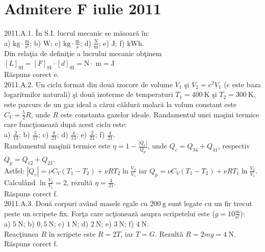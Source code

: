 \section{Admitere F iulie 2011}

2011.A.1. În S.I. lucrul mecanic se măsoară în:\\ a) $\mathrm{kg} \cdot \frac{\mathrm{m}}{\mathrm{s}^{2}}$; b) $\mathrm{W}$; c) $\mathrm{kg} \cdot \frac{\mathrm{m}}{\mathrm{s}}$; d) $\frac{\mathrm{N}}{\mathrm{m}}$; e) $\mathrm{J}$; f) $\mathrm{kWh}$.\\ Din relaţia de definiţie a lucrului mecanic obţinem $[L]_{\mathrm{SI}}=[F]_{\mathrm{SI}} \cdot[d]_{\mathrm{SI}}=\mathrm{N} \cdot \mathrm{~m}=\mathrm{J}$\\ Răspuns corect e.\\

2011.A.2. Un ciclu format din două izocore de volume $V_{1}$ şi $V_{2}=e^{2} V_{1}$ ($e$ este baza logaritmilor naturali) şi două izoterme de temperaturi $T_{1}=400 \mathrm{~K}$ şi $T_{2}=300 \mathrm{~K}$, este parcurs de un gaz ideal a cărui căldură molară la volum constant este $C_{V}=\frac{5}{2} R$, unde $R$ este constanta gazelor ideale. Randamentul unei maşini termice care funcţionează după acest ciclu este:\\ a) $\frac{2}{13}$; b) $\frac{5}{17}$; c) $\frac{8}{21}$; d) $\frac{4}{13}$; e) $\frac{2}{21}$; f) $\frac{4}{21}$.\\ Randamentul maşinii termice este $\eta=1-\frac{\left|Q_{c}\right|}{Q_{p}}$, unde $Q_{c}=Q_{34}+Q_{41}$, respectiv $Q_{p}=Q_{12}+Q_{23}$.\\ Astfel: $\left|Q_{c}\right|=\nu C_{V}\left(T_{1}-T_{2}\right)+\nu R T_{2} \ln \frac{V_{2}}{V_{1}}$ iar $Q_{p}=\nu C_{V}\left(T_{1}-T_{2}\right)+\nu R T_{1} \ln \frac{V_{2}}{V_{1}}$.\\ Calculând $\ln \frac{V_{2}}{V_{1}}=2$, rezultă $\eta=\frac{4}{21}$.\\ Răspuns corect f.\\

2011.A.3. Două corpuri având masele egale cu $200 \mathrm{~g}$ sunt legate cu un fir trecut peste un scripete fix. Forţa care acţionează asupra scripetelui este ($g=10 \frac{\mathrm{m}}{\mathrm{s}^{2}}$):\\ a) $5 \mathrm{~N}$; b) $0,5 \mathrm{~N}$; c) $1 \mathrm{~N}$; d) $2 \mathrm{~N}$; e) $3 \mathrm{~N}$; f) $4 \mathrm{~N}$.\\ Reacţiunea $R$ în scripete este $R=2 T$, iar $T=G$. Rezultă $R=2 m g=4 \mathrm{~N}$.\\ Răspuns corect f.\\


